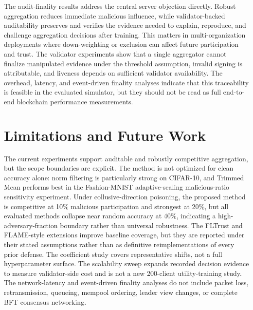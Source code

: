 \documentclass[preprint,12pt]{elsarticle}
\begin{document}
The audit-finality results address the central server objection directly. Robust aggregation reduces immediate malicious influence, while validator-backed auditability preserves and verifies the evidence needed to explain, reproduce, and challenge aggregation decisions after training. This matters in multi-organization deployments where down-weighting or exclusion can affect future participation and trust. The validator experiments show that a single aggregator cannot finalize manipulated evidence under the threshold assumption, invalid signing is attributable, and liveness depends on sufficient validator availability. The overhead, latency, and event-driven finality analyses indicate that this traceability is feasible in the evaluated simulator, but they should not be read as full end-to-end blockchain performance measurements.

\section{Limitations and Future Work}

The current experiments support auditable and robustly competitive aggregation, but the scope boundaries are explicit. The method is not optimized for clean accuracy alone: norm filtering is particularly strong on CIFAR-10, and Trimmed Mean performs best in the Fashion-MNIST adaptive-scaling malicious-ratio sensitivity experiment. Under collusive-direction poisoning, the proposed method is competitive at 10\% malicious participation and strongest at 20\%, but all evaluated methods collapse near random accuracy at 40\%, indicating a high-adversary-fraction boundary rather than universal robustness. The FLTrust and FLAME-style extensions improve baseline coverage, but they are reported under their stated assumptions rather than as definitive reimplementations of every prior defense. The coefficient study covers representative shifts, not a full hyperparameter surface. The scalability sweep expands recorded decision evidence to measure validator-side cost and is not a new 200-client utility-training study. The network-latency and event-driven finality analyses do not include packet loss, retransmission, queueing, mempool ordering, leader view changes, or complete BFT consensus networking.
\end{document}
